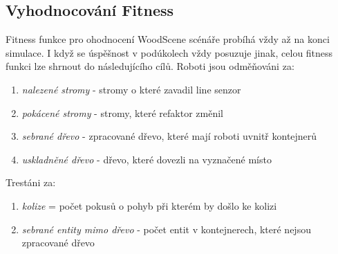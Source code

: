 \subsection{Vyhodnocování Fitness}
Fitness funkce pro ohodnocení WoodScene scénáře probíhá vždy až na konci simulace. I když se úspěšnost v podúkolech  vždy posuzuje jinak, celou fitness funkci lze shrnout do následujícího cílů. Roboti jsou odměňováni za: 
\begin{enumerate}
        \item \textit{nalezené stromy} - stromy o které zavadil line senzor 
        \item \textit{pokácené stromy} - stromy, které refaktor změnil 
        \item \textit{sebrané dřevo} - zpracované dřevo, které mají roboti uvnitř kontejnerů 
        \item \textit{uskladněné dřevo} - dřevo, které dovezli na vyznačené místo 
\end{enumerate}
Trestáni za:
\begin{enumerate}
	\item \textit{kolize} = počet pokusů o pohyb při kterém by došlo ke kolizi 
	\item \textit{sebrané entity mimo dřevo} - počet entit v kontejnerech, které nejsou zpracované dřevo 
\end{enumerate}

